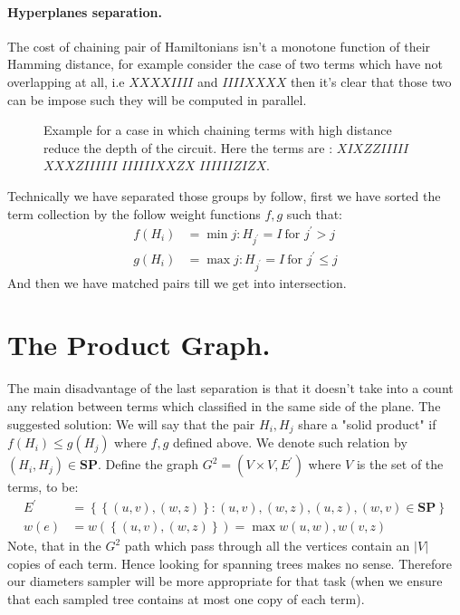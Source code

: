 \documentclass{article}
\begin{document}
\begin{multicols*}{2}
\paragraph{Hyperplanes separation.} The cost of chaining pair of Hamiltonians isn't  a monotone function of their Hamming distance, for example consider the case of two terms which have not overlapping at all, i.e \( XXXXIIII \) and \(IIIIXXXX \) then it's clear that those two can be impose such they will be computed in parallel.   


\begin{figure}[H]
  \centering
    
    \caption{ Example for a case in which chaining terms with high distance reduce the depth of the circuit. Here the terms are : \(XIXZZIIIII \) \( XXXZIIIIII \) \( IIIIIIXXZX\) \( IIIIIIZIZX \). }
    \label{fig:average-data-vs-model}
\end{figure}

Technically we have separated those groups by follow, first we have sorted the term collection by the follow weight functions \(f,g\) such that:
\begin{equation*}
    \begin{split}
        f\left(H_{i}\right) &= \min {j : H_{j^{\prime}} = I \ \text{for } j^{\prime} > j } \\
        g\left(H_{i}\right) &= \max {j : H_{j^{\prime}} = I \ \text{for } j^{\prime} \le j }
    \end{split}
\end{equation*}    
And then we have matched pairs till we get into intersection.  
\section{The Product Graph.}
The main disadvantage of the last separation is that it doesn't take into a count any relation between terms which classified in the same side of the plane. The suggested solution: We will say that the pair \(H_i, H_j\) share a "solid product" if  \( f\left(H_{i}\right) \le g \left(H_{j}\right) \) where \(f,g\) defined above. We denote such relation by \(\left(H_i, H_j\right) \in \textbf{SP} \). Define the graph \(G^2 = \left(V\times V , E^{\prime}\right)\) where \(V\) is the set of the terms, to be: 
\begin{equation*}
    \begin{split}
        E^{\prime} &= \left\{ \left\{ (u,v),(w,z) \right\} : (u,v),(w,z),(u,z),(w,v) \in \textbf{SP} \right\}  \\
        w(e) &= w\left( \left\{ (u,v),(w,z) \right\} \right) = \max { w(u,w),w(v,z) }
    \end{split}
\end{equation*}
Note, that in the \(G^2\) path which pass through all the vertices contain an \(|V|\) copies of each term. Hence looking for spanning trees makes no sense. Therefore our diameters sampler will be more appropriate for that task (when we ensure that each sampled tree contains at most one copy of each term).          


\end{multicols*}
\end{document}
